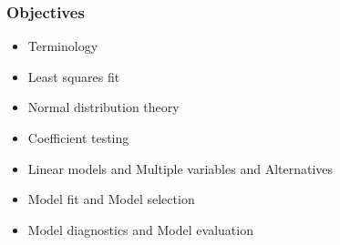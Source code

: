\documentclass[xcolor={dvipsnames}]{beamer}
\begin{document}
\frame
{
\normalsize
 \frametitle{Objectives}
\begin{itemize}
\item Terminology 
\item Least squares fit
\item Normal distribution theory  
\item Coefficient testing
\item Linear models and Multiple variables and Alternatives
\item Model fit and Model selection
\item Model diagnostics and Model evaluation
\end{itemize}

}
\end{document}
